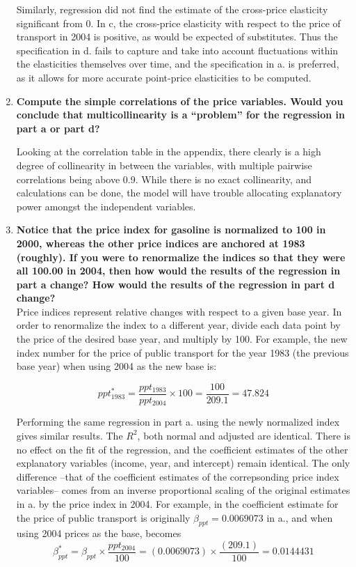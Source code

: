 \documentclass{article}
\begin{document}
\begin{enumerate}[label=\alph*.]
Similarly, regression did not find the estimate of the cross-price elasticity significant from 0. In c, the cross-price elasticity with respect to the price of transport in 2004 is positive, as would be expected of substitutes. Thus the specification in d. fails to capture and take into account fluctuations within the elasticities themselves over time, and the specification in a. is preferred, as it allows for more accurate point-price elasticities to be computed.

\newpage
\item \textbf{Compute the simple correlations of the price variables. Would you conclude that multicollinearity is a ``problem'' for the regression in part a or part d?}

Looking at the correlation table in the appendix, there clearly is a high degree of collinearity in between the variables, with multiple pairwise correlations being above 0.9. While there is no exact collinearity, and calculations can be done, the model will have trouble allocating explanatory power amongst the independent variables.


\item \textbf{Notice that the price index for gasoline is normalized to 100 in 2000, whereas the other price indices are anchored at 1983 (roughly). If you were to renormalize the indices so that they were all 100.00 in 2004, then how would the results of the regression in part a change? How would the results of the regression in part d change?}\\

Price indices represent relative changes with respect to a given base year. In order to renormalize the index to a different year, divide each data point by the price of the desired base year, and multiply by 100. For example, the new index number for the price of public transport for the year 1983 (the previous base year) when using 2004 as the new base is:

$$ ppt_{1983}^* = \frac{ppt_{1983}}{ppt_{2004}}\times 100 = \frac{100}{209.1} = 47.824$$

Performing the same regression in part a. using the newly normalized index gives similar results. The $R^2$, both normal and adjusted are identical. There is no effect on the fit of the regression, and the coefficient estimates of the other explanatory variables (income, year, and intercept) remain identical. The only difference --that of the coefficient estimates of the correpsonding price index variables-- comes from an inverse proportional scaling of the original estimates in a. by the price index in 2004.	 For example, in the coefficient estimate for the price of public transport is originally $\beta_{ppt} = 0.0069073 $ in a., and when using 2004 prices as the base, becomes
$$\beta_{ppt}^* = \beta_{ppt} \times  \frac{ppt_{2004}}{100} = (0.0069073) \times \frac{(209.1)}{100} = 0.0144431 $$ 


\end{enumerate}
\end{document}

